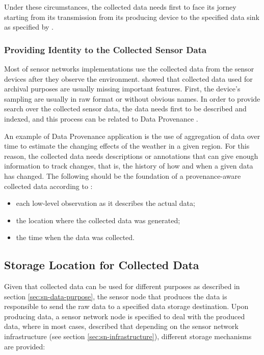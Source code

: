 Under these circumstances, the collected data needs first to face its jorney
starting from its transmission from its producing device to the specified data 
sink as specified by \cite{sn-storage01} \cite{sn-storage02} \cite{sn-storage03}.

\subsubsection{Providing Identity to the Collected Sensor Data}

Most of sensor networks implementations use the collected data from the sensor
devices after they observe the environment. \cite{sn-provenance01} showed that
collected data used for archival purposes are usually missing important
features. First, the device's sampling are usually in raw format or without
obvious names. In order to provide search over the collected sensor data, the
data needs first to be described and indexed, and this process can be related
to Data Provenance \cite{db-provenance}. 

An example of Data Provenance application is the use of aggregation of data
over time to estimate the changing effects of the weather in a given region.
For this reason, the collected data needs descriptions or annotations that can
give enough information to track changes, that is, the history of how and when
a given data has changed. The following should be the foundation of a
provenance-aware collected data according to \cite{sn-provenance01}:

\begin{itemize}
  \item each low-level observation as it describes the actual data;
  \item the location where the collected data was generated;
  \item the time when the data was collected.
\end{itemize}

\subsection{Storage Location for Collected Data}
\label{sec:sn-storage-locations}

Given that collected data can be used for different purposes as described in
section \ref{sec:sn-data-purpose}, the sensor node that produces the data is
responsible to send the raw data to a specified data storage destination. Upon
producing data, a sensor network node is specified to deal with the produced
data, where in most cases, \cite{sn-storage03} described that depending on the
sensor network infrastructure (see section \ref{sec:sn-infrastructure}),
different storage mechanisms are provided:

